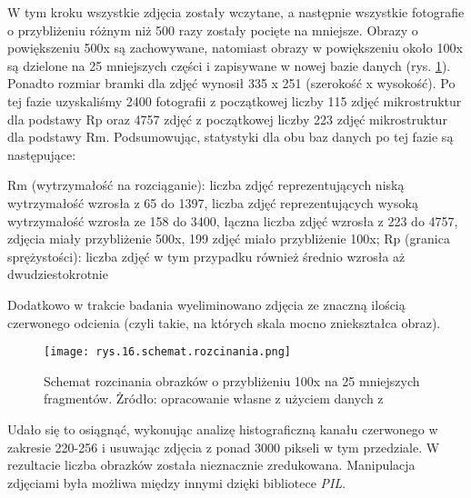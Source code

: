 W tym kroku wszystkie zdjęcia zostały wczytane, a następnie wszystkie fotografie o przybliżeniu różnym niż 500 razy zostały pocięte na mniejsze. Obrazy o powiększeniu 500x są zachowywane, natomiast obrazy w powiększeniu około 100x są dzielone na 25 mniejszych części i zapisywane w nowej bazie danych (rys. \ref{fig:mesh16}). Ponadto rozmiar bramki dla zdjęć wynosił 335 x 251 (szerokość x  wysokość). Po tej fazie uzyskaliśmy 2400 fotografii z początkowej liczby 115 zdjęć mikrostruktur dla podstawy Rp oraz 4757 zdjęć z początkowej liczby 223 zdjęć mikrostruktur dla podstawy Rm. Podsumowując, statystyki dla obu baz danych po tej fazie są następujące:

\begin{outline}
	\1 Rm (wytrzymałość na rozciąganie):
		\2 liczba zdjęć reprezentujących niską wytrzymałość wzrosła z 65 do 1397,
		\2 liczba zdjęć reprezentujących wysoką wytrzymałość wzrosła ze 158 do 3400,
		\2 łączna liczba zdjęć wzrosła z 223 do 4757,
		 zdjęcia miały przybliżenie 500x, 199 zdjęć miało przybliżenie 100x;
	\1 Rp (granica sprężystości):
		\2 liczba zdjęć w tym przypadku również średnio wzrosła aż dwudziestokrotnie
\end{outline}

Dodatkowo w trakcie badania wyeliminowano zdjęcia ze znaczną ilością czerwonego odcienia (czyli takie, na których skala mocno zniekształca obraz).
\begin{figure}[h]
    \centering
    \texttt{[image: rys.16.schemat.rozcinania.png]}
    \caption{Schemat rozcinania obrazków o przybliżeniu 100x na 25 mniejszych fragmentów. Żródło: opracowanie własne z użyciem danych z \cite{Pirowski17}}
    \label{fig:mesh16}
\end{figure}
Udało się to osiągnąć, wykonując analizę histograficzną kanału czerwonego w zakresie 220-256 i usuwając zdjęcia z ponad 3000 pikseli w tym przedziale. W rezultacie liczba obrazków została nieznacznie zredukowana. Manipulacja zdjęciami była możliwa między innymi dzięki bibliotece \textit{PIL}.


